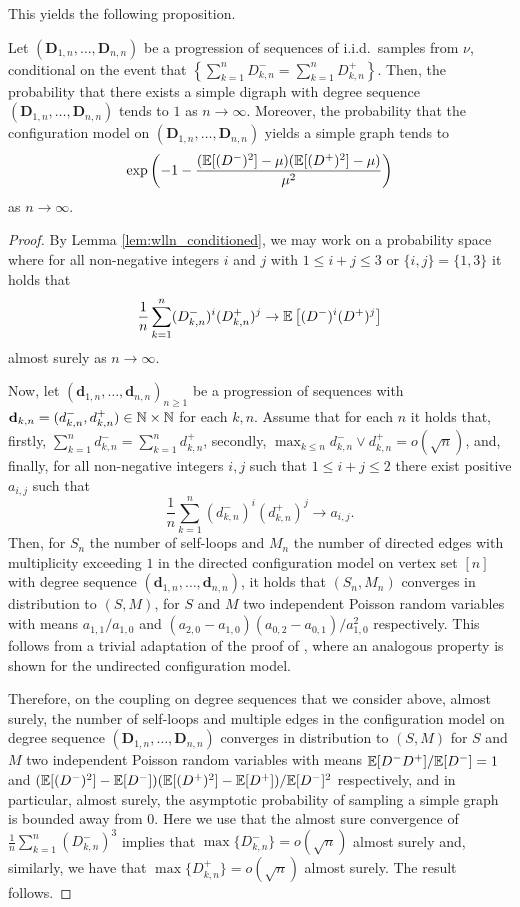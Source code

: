 This yields the following proposition.
\begin{proposition}\label{prop:simple}
Let $\left(\mathbf{D}_{1,n},\dots,\mathbf{D}_{n,n}\right)$ be a progression of  sequences of i.i.d.\ samples from $\nu$, conditional on the event that $\left\{\sum_{k=1}^n D_{k,n}^-=\sum_{k=1}^n D_{k,n}^+ \right\}$. Then, the probability that there exists a simple digraph with degree sequence $\left(\mathbf{D}_{1,n},\dots,\mathbf{D}_{n,n}\right)$ tends to $1$ as $n\to \infty$. Moreover, the probability that the configuration model on $\left(\mathbf{D}_{1,n},\dots,\mathbf{D}_{n,n}\right)$ yields a simple graph tends to 
$$\exp\left(-1-\frac{({\mathbb E}[(D^-)^2]-\mu)({\mathbb E}[(D^+)^2]-\mu)}{\mu^2}\right)$$ as $n\to \infty$. 
\end{proposition}
\begin{proof}
By Lemma \ref{lem:wlln_conditioned}, we may work on a probability space where for all non-negative integers $i$ and $j$ with $1\leq i+j \leq 3$ or $\{i,j\}=\{1,3\}$ it holds that 
$$\frac{1}{n}\sum_{k=1}^n (D_{k,n}^-)^i(D_{k,n}^+)^j\rightarrow {\mathbb E}\left[ (D^-)^i(D^+)^j \right]$$
almost surely as $n\to \infty$.

Now, let $(\mathbf{d}_{1,n},\dots, \mathbf{d}_{n,n})_{n\geq 1}$ be a progression of sequences with $\mathbf{d}_{k,n}=(d_{k,n}^-,d_{k,n}^+)\in {\mathbb N}\times {\mathbb N}$ for each $k,n$. Assume that for each $n$ it holds that, firstly, $\sum_{k=1}^n {d}^-_{k,n}=\sum_{k=1}^n {d}^+_{k,n}$, secondly, $\max_{k\leq n} d_{k,n}^-\vee d_{k,n}^+ =o(\sqrt{n})$, and, finally, for all non-negative integers $i,j$ such that $1\leq i+j\leq 2$ there exist positive $a_{i,j}$ such that
$$\frac{1}{n}\sum_{k=1}^n (d_{k,n}^-)^i(d_{k,n}^+)^j\rightarrow a_{i,j}.$$ Then, for $S_n$ the number of self-loops and $M_n$ the number of directed edges with multiplicity exceeding $1$ in the directed configuration model on vertex set $[n]$ with degree sequence $(\mathbf{d}_{1,n},\dots, \mathbf{d}_{n,n})$, it holds that $(S_n,M_n)$ converges in distribution to $(S,M)$, for $S$ and $M$ two independent Poisson random variables with means $a_{1,1}/a_{1,0}$ and $(a_{2,0}-a_{1,0})(a_{0,2}-a_{0,1})/a_{1,0}^2$ respectively. This follows from a trivial adaptation of the proof of \cite[Proposition 7.13]{hofstadRandomGraphsComplex2017}, where an analogous property is shown for the undirected configuration model.

Therefore, on the coupling on degree sequences that we consider above, almost surely, the number of self-loops and multiple edges in the configuration model on degree sequence $\left(\mathbf{D}_{1,n},\dots,\mathbf{D}_{n,n}\right)$ converges in distribution to $(S,M)$ for $S$ and $M$ two independent Poisson random variables with means ${\mathbb E}[D^-D^+]/{\mathbb E}[D^-]=1$ and $({\mathbb E}[(D^-)^2]-{\mathbb E}[D^-])({\mathbb E}[(D^+)^2]-{\mathbb E}[D^+])/{\mathbb E}[D^-]^2$ respectively, and in particular, almost surely, the asymptotic probability of sampling a simple graph is bounded away from $0$. Here we use that the almost sure convergence of $\frac{1}{n}\sum_{k=1}^n (D_{k,n}^-)^3$ implies that $\max\{D^-_{k,n}\}=o(\sqrt{n})$ almost surely and, similarly, we have that $\max\{D^+_{k,n}\}=o(\sqrt{n})$ almost surely. The result follows. 
\end{proof}


